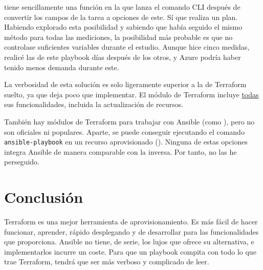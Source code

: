 \documentclass[11pt]{article}
\begin{document}
\begin{flushleft}
\begin{minipage}{.46\textwidth}
        \end{minipage}%
        \hspace{1.5cm}
        \begin{minipage}{.41\textwidth}
            \inputminted[fontsize=\scriptsize, firstline=25, lastline=34, linenos, frame=single, breaklines]{yaml}{../../ansible/terraform_ansible/terraform/main.yml}
            \vspace{-.4cm}
            \vspace{.4cm}
            
        \end{minipage}
        \vspace{-.25cm}
        
tiene sencillamente una función en la que lanza el comando CLI después de convertir los campos de la tarea a opciones de este. Sí que realiza un plan. Habiendo explorado esta posibilidad y sabiendo que había seguido el mismo método para todas las mediciones, la posibilidad más probable es que no controlase suficientes variables durante el estudio. Aunque hice cinco medidas, realicé las de este playbook días después de los otros, y Azure podría haber tenido menos demanda durante este.
\linebreak

La verbosidad de esta solución es solo ligeramente superior a la de Terraform suelto, ya que deja poco que implementar. El módulo de Terraform incluye \underline{todas} sus funcionalidades, incluida la actualización de recursos.
\linebreak

También hay módulos de Terraform para trabajar con Ansible (como \cite{terraform_ansible_cloud}), pero no son oficiales ni populares. Aparte, se puede conseguir ejecutando el comando \texttt{ansible-playbook} en un recurso aprovisionado (\cite{terraform_ansible_digitaloc}). Ninguna de estas opciones integra Ansible de manera comparable con la inversa. Por tanto, no las he perseguido.








\clearpage
\section{Conclusión}
Terraform es una mejor herramienta de aprovisionamiento. Es más fácil de hacer funcionar, aprender, rápido desplegando y de desarrollar para las funcionalidades que proporciona. Ansible no tiene, de serie, los lujos que ofrece su alternativa, e implementarlos incurre un coste. Para que un playbook compita con todo lo que trae Terraform, tendrá que ser más verboso y complicado de leer.
\linebreak


\end{flushleft}
\end{document}
